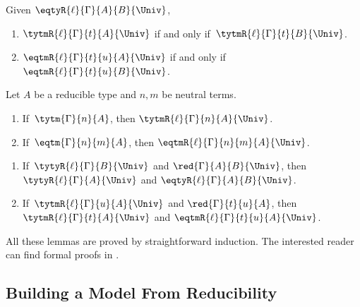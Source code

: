 \begin{lemma}[Conversion]
  Given \( \eqtyR{\ell}{\Gamma}{A}{B}{\Univ} \),
  \begin{enumerate}
    \item \( \tytmR{\ell}{\Gamma}{t}{A}{\Univ} \) if and only if\, \( \tytmR{\ell}{\Gamma}{t}{B}{\Univ} \).
    \item \( \eqtmR{\ell}{\Gamma}{t}{u}{A}{\Univ} \) if and only if\, \( \eqtmR{\ell}{\Gamma}{t}{u}{B}{\Univ} \).
  \end{enumerate}
\end{lemma}

\begin{lemma} Let \( A \) be a reducible type and \( n, m \) be neutral terms.
  \begin{enumerate}
    \item If\, \( \tytm{\Gamma}{n}{A} \), then \( \tytmR{\ell}{\Gamma}{n}{A}{\Univ} \).
    \item If\, \( \eqtm{\Gamma}{n}{m}{A} \), then \( \eqtmR{\ell}{\Gamma}{n}{m}{A}{\Univ} \).
  \end{enumerate}
\end{lemma}

\begin{lemma} \phantom{a}
  \begin{enumerate}
    \item If\, \( \tytyR{\ell}{\Gamma}{B}{\Univ} \) and \( \red{\Gamma}{A}{B}{\Univ} \),
      then \( \tytyR{\ell}{\Gamma}{A}{\Univ} \) and \( \eqtyR{\ell}{\Gamma}{A}{B}{\Univ} \).
    \item If\, \( \tytmR{\ell}{\Gamma}{u}{A}{\Univ} \) and \( \red{\Gamma}{t}{u}{A} \),
    then \( \tytmR{\ell}{\Gamma}{t}{A}{\Univ} \) and \( \eqtmR{\ell}{\Gamma}{t}{u}{A}{\Univ} \).
  \end{enumerate}
\end{lemma}

All these lemmas are proved by straightforward induction. The interested reader can find
formal proofs in .

\subsection{Building a Model From Reducibility}
\label{sec:validity}

